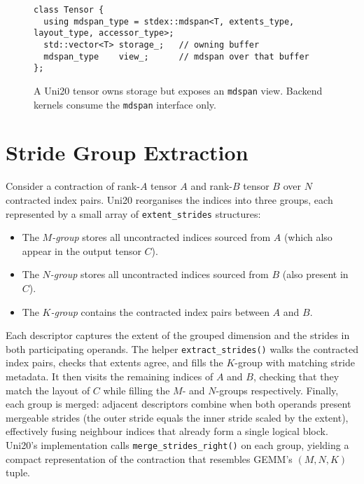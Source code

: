 \documentclass[11pt]{article}
\begin{document}
\begin{figure}[h]
  \centering
  \begin{minipage}{0.9\linewidth}
    \begin{lstlisting}
class Tensor {
  using mdspan_type = stdex::mdspan<T, extents_type, layout_type, accessor_type>;
  std::vector<T> storage_;   // owning buffer
  mdspan_type    view_;      // mdspan over that buffer
};
    \end{lstlisting}
  \end{minipage}
  \caption{A Uni20 tensor owns storage but exposes an \texttt{mdspan} view.  Backend kernels consume
  the \texttt{mdspan} interface only.}
  \label{fig:tensor-mdspan}
\end{figure}

\section{Stride Group Extraction}
Consider a contraction of rank-$A$ tensor $A$ and rank-$B$ tensor $B$ over $N$ contracted index
pairs.  Uni20 reorganises the indices into three groups, each represented by a small array of
\texttt{extent\_strides} structures:
\begin{itemize}
  \item The \emph{$M$-group} stores all uncontracted indices sourced from $A$ (which also appear in
        the output tensor $C$).
  \item The \emph{$N$-group} stores all uncontracted indices sourced from $B$ (also present in $C$).
  \item The \emph{$K$-group} contains the contracted index pairs between $A$ and $B$.
\end{itemize}
Each descriptor captures the extent of the grouped dimension and the strides in both participating
operands.  The helper \texttt{extract\_strides()} walks the contracted index pairs, checks that
extents agree, and fills the $K$-group with matching stride metadata.  It then visits the remaining
indices of $A$ and $B$, checking that they match the layout of $C$ while filling the $M$- and
$N$-groups respectively.  Finally, each group is merged: adjacent descriptors combine when both
operands present mergeable strides (the outer stride equals the inner stride scaled by the extent),
effectively fusing neighbour indices that already form a single logical block.  Uni20's implementation
calls \texttt{merge\_strides\_right()} on each group, yielding a compact representation of the
contraction that resembles GEMM's $(M,N,K)$ tuple.
\end{document}
